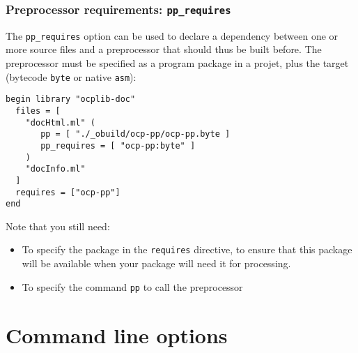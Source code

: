 \subsubsection{Preprocessor requirements: {\tt pp\_requires}}

The {\tt pp\_requires} option can be used to declare a dependency
between one or more source files and a preprocessor that should thus
be built before. The preprocessor must be specified as a program
package in a projet, plus the target (bytecode {\tt byte} or native
{\tt asm}):

\begin{verbatim}
begin library "ocplib-doc"
  files = [
    "docHtml.ml" (
       pp = [ "./_obuild/ocp-pp/ocp-pp.byte ]
       pp_requires = [ "ocp-pp:byte" ]
    )
    "docInfo.ml"
  ]
  requires = ["ocp-pp"]
end
\end{verbatim}

Note that you still need:
\begin{itemize}
\item To specify the package in the {\tt requires} directive, to ensure that
  this package will be available when your package will need it for processing.
\item To specify the command {\tt pp} to call the preprocessor
\end{itemize}

\section{Command line options}

